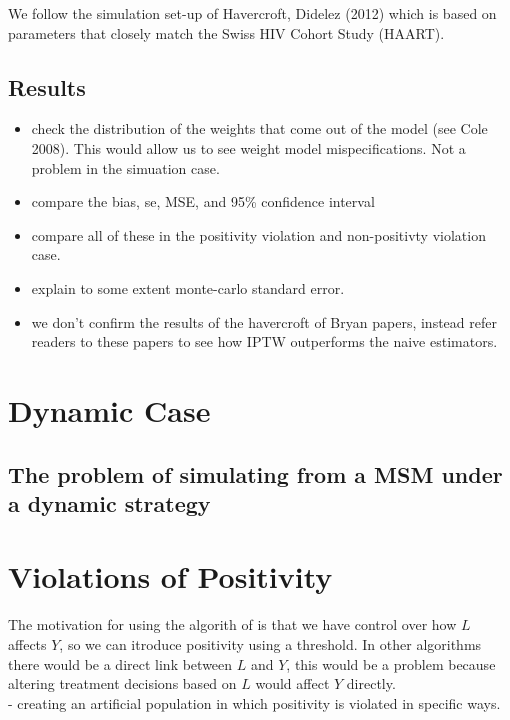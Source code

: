 \documentclass[11pt]{article}
\begin{document}
We follow the simulation set-up of Havercroft, Didelez (2012) which is
based on parameters that closely match the Swiss HIV Cohort Study
(HAART).

\subsection{Results}\label{results}

\begin{itemize}
\item
  check the distribution of the weights that come out of the model (see
  Cole 2008). This would allow us to see weight model mispecifications.
  Not a problem in the simuation case.
\item
  compare the bias, se, MSE, and 95\% confidence interval
\item
  compare all of these in the positivity violation and non-positivty
  violation case.
\item
  explain to some extent monte-carlo standard error.
\item
  we don't confirm the results of the havercroft of Bryan papers,
  instead refer readers to these papers to see how IPTW outperforms the
  naive estimators.
\end{itemize}

    \section{Dynamic Case}\label{dynamic-case}

\subsection{The problem of simulating from a MSM under a dynamic
strategy}\label{the-problem-of-simulating-from-a-msm-under-a-dynamic-strategy}

    \section{Violations of Positivity}\label{violations-of-positivity}

The motivation for using the algorith of \citet{Havercroft2012} is that
we have control over how \(L\) affects \(Y\), so we can itroduce
positivity using a threshold. In other algorithms there would be a
direct link between \(L\) and \(Y\), this would be a problem because
altering treatment decisions based on \(L\) would affect \(Y\)
directly.\\
- creating an artificial population in which positivity is violated in
specific ways.
\end{document}
